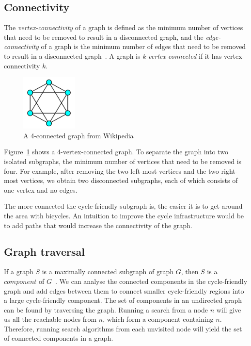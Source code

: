 \documentclass[12pt,a4paper]{report}
\begin{document}
\subsection{Connectivity}\label{sec:context connectivity}
The \textit{vertex-connectivity} of a graph is defined as the minimum number of vertices that need to be removed to result in a disconnected graph, and the \textit{edge-connectivity} of a graph is the minimum number of edges that need to be removed to result in a disconnected graph~\cite{buckley1990distance}. A graph is \textit{k-vertex-connected} if it has vertex-connectivity $k$.

\begin{figure}[ht]
    \centering
    \includegraphics[width=0.25\textwidth]{diss_images/context/connectivity.png}
    \caption{A 4-connected graph from Wikipedia~\cite{WikipediaEN:Connectivity}}
    \label{fig:connectivity4}
\end{figure}

Figure~\ref{fig:connectivity4} shows a 4-vertex-connected graph. To separate the graph into two isolated subgraphs, the minimum number of vertices that need to be removed is four. For example, after removing the two left-most vertices and the two right-most vertices, we obtain two disconnected subgraphs, each of which consists of one vertex and no edges. 

The more connected the cycle-friendly subgraph is, the easier it is to get around the area with bicycles. An intuition to improve the cycle infrastructure would be to add paths that would increase the connectivity of the graph.

\subsection{Graph traversal}
If a graph $S$ is a maximally connected subgraph of graph $G$, then $S$ is a $component$ of $G$~\cite{citeulike:395714}. We can analyse the connected components in the cycle-friendly graph and add edges between them to connect smaller cycle-friendly regions into a large cycle-friendly component. The set of components in an undirected graph can be found by traversing the graph. Running a search from a node $n$ will give us all the reachable nodes from $n$, which form a component containing $n$. Therefore, running search algorithms from each unvisited node will yield the set of connected components in a graph.
\end{document}
